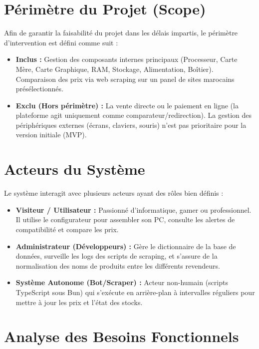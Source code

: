 \documentclass[12pt,a4paper]{article}
\begin{document}
\section{Périmètre du Projet (Scope)}
Afin de garantir la faisabilité du projet dans les délais impartis, le périmètre d'intervention est défini comme suit :
\begin{itemize}[label=\textbullet]
\item \textbf{Inclus :} Gestion des composants internes principaux (Processeur, Carte Mère, Carte Graphique, RAM, Stockage, Alimentation, Boîtier). Comparaison des prix via web scraping sur un panel de sites marocains présélectionnés.
\item \textbf{Exclu (Hors périmètre) :} La vente directe ou le paiement en ligne (la plateforme agit uniquement comme comparateur/redirection). La gestion des périphériques externes (écrans, claviers, souris) n'est pas prioritaire pour la version initiale (MVP).
\end{itemize}

\section{Acteurs du Système}
Le système interagit avec plusieurs acteurs ayant des rôles bien définis :
\begin{itemize}[label=\textbullet]
\item \textbf{Visiteur / Utilisateur :} Passionné d'informatique, gamer ou professionnel. Il utilise le configurateur pour assembler son PC, consulte les alertes de compatibilité et compare les prix.
\item \textbf{Administrateur (Développeurs) :} Gère le dictionnaire de la base de données, surveille les logs des scripts de scraping, et s'assure de la normalisation des noms de produits entre les différents revendeurs.
\item \textbf{Système Autonome (Bot/Scraper) :} Acteur non-humain (scripts TypeScript sous Bun) qui s'exécute en arrière-plan à intervalles réguliers pour mettre à jour les prix et l'état des stocks.
\end{itemize}

\section{Analyse des Besoins Fonctionnels}
\end{document}
